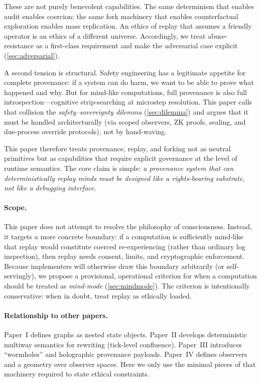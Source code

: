 \documentclass{aion}
\begin{document}
These are not purely benevolent capabilities.
The same determinism that enables audit enables coercion; the same fork machinery that enables
counterfactual exploration enables mass replication.
An ethics of replay that assumes a friendly operator is an ethics of a different universe.
Accordingly, we treat abuse-resistance as a first-class requirement and make the adversarial case
explicit (\cref{sec:adversarial}).

A second tension is structural.
Safety engineering has a legitimate appetite for complete provenance: if a system can do harm, we
want to be able to prove what happened and why.
But for mind-like computations, full provenance is also full introspection---cognitive strip-searching
at microstep resolution.
This paper calls that collision the \emph{safety--sovereignty dilemma} (\cref{sec:dilemma}) and argues
that it must be handled architecturally (via scoped observers, ZK proofs, sealing, and due-process
override protocols), not by hand-waving.

This paper therefore treats provenance, replay, and forking not as neutral primitives but as
capabilities that require explicit governance at the level of runtime semantics.
The core claim is simple: \emph{a provenance system that can deterministically replay minds must be
designed like a rights-bearing substrate, not like a debugging interface}.

\paragraph{Scope.}
This paper does not attempt to resolve the philosophy of consciousness.
Instead, it targets a more concrete boundary: if a computation is sufficiently mind-like that replay
would constitute coerced re-experiencing (rather than ordinary log inspection), then replay needs
consent, limits, and cryptographic enforcement.
Because implementers will otherwise draw this boundary arbitrarily (or self-servingly), we propose
a provisional, operational criterion for when a computation should be treated as \emph{mind-mode}
(\cref{sec:mindmode}).
The criterion is intentionally conservative: when in doubt, treat replay as ethically loaded.

\paragraph{Relationship to other papers.}
Paper~I defines \WARP{} graphs as nested state objects.
Paper~II develops deterministic multiway semantics for \WARP{} rewriting (tick-level confluence).
Paper~III introduces ``wormholes'' and holographic provenance payloads.
Paper~IV defines observers and a geometry over observer spaces.
Here we only use the minimal pieces of that machinery required to state ethical constraints.
\end{document}
